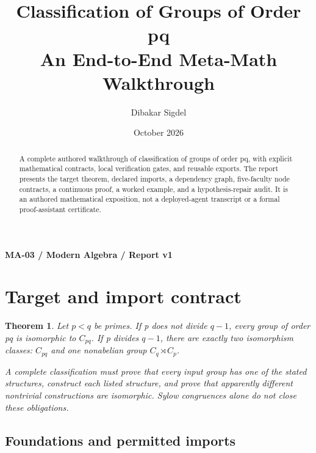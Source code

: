 \documentclass[preprint,12pt,aps,pra,showkeys,amsmath,amssymb,superscriptaddress,floatfix]{revtex4-2}
\newtheorem{theorem}{Theorem}[section]
\theoremstyle{definition}
\theoremstyle{remark}
\begin{document}
\title{Classification of Groups of Order pq\\[4pt]\large An End-to-End Meta-Math Walkthrough}

\author{Dibakar Sigdel}


\date{October 2026}

\begin{abstract}

A complete authored walkthrough of classification of groups of order pq,
with explicit mathematical contracts, local verification gates, and
reusable exports. The report presents the target theorem, declared
imports, a dependency graph, five-faculty node contracts, a continuous
proof, a worked example, and a hypothesis-repair audit. It is an
authored mathematical exposition, not a deployed-agent transcript or a
formal proof-assistant certificate.

\end{abstract}\maketitle\linespread{1.12}\selectfont

\noindent\textbf{MA-03 / Modern Algebra / Report v1}

\section{Target and import contract}

\begin{theorem}

Let \(p<q\) be primes. If p does not divide \(q-1\), every group of
order pq is isomorphic to \(C_{pq}\). If p divides \(q-1\), there are
exactly two isomorphism classes: \(C_{pq}\) and one nonabelian group
\(C_q\rtimes C_p\).

A complete classification must prove that every input group has one of
the stated structures, construct each listed structure, and prove that
apparently different nontrivial constructions are isomorphic. Sylow
congruences alone do not close these obligations.

\end{theorem}

\subsection{Foundations and permitted imports}
\end{document}
